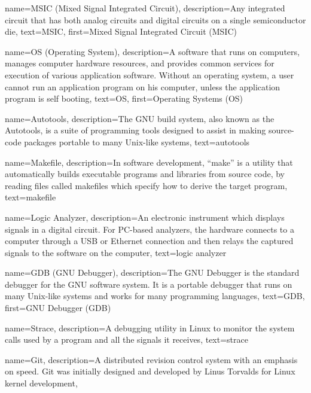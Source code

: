 {
  name=MSIC (Mixed Signal Integrated Circuit),
  description={Any integrated circuit that has both analog circuits
    and digital circuits on a single semiconductor die},
  text=MSIC,
  first=Mixed Signal Integrated Circuit (MSIC)
}

{
  name=OS (Operating System),
  description={A software that runs on computers, manages computer
    hardware resources, and provides common services for execution of
    various application software. Without an operating system, a user
    cannot run an application program on his computer, unless the
    application program is self booting},
  text=OS,
  first=Operating Systems (OS)
}

{
  name=Autotools,
  description={The GNU build system, also known as the Autotools, is a
    suite of programming tools designed to assist in making
    source-code packages portable to many Unix-like systems},
  text=autotools
}

{
  name=Makefile,
  description={In software development, ``make'' is a utility that
    automatically builds executable programs and libraries from source
    code, by reading files called makefiles which specify how to
    derive the target program},
  text=makefile
}

{
  name=Logic Analyzer,
  description={An electronic instrument which displays signals in a
    digital circuit. For PC-based analyzers, the hardware connects to
    a computer through a USB or Ethernet connection and then relays
    the captured signals to the software on the computer},
  text=logic analyzer
}

{
  name=GDB (GNU Debugger),
  description={The GNU Debugger is the standard debugger for the GNU
    software system. It is a portable debugger that runs on many
    Unix-like systems and works for many programming languages},
  text=GDB,
  first=GNU Debugger (GDB)
}

{
  name=Strace,
  description={A debugging utility in Linux to monitor the system
    calls used by a program and all the signals it receives},
  text=strace
}

{
  name=Git,
  description={A distributed revision control system with an emphasis
    on speed. Git was initially designed and developed by Linus
    Torvalds for Linux kernel development},
}

